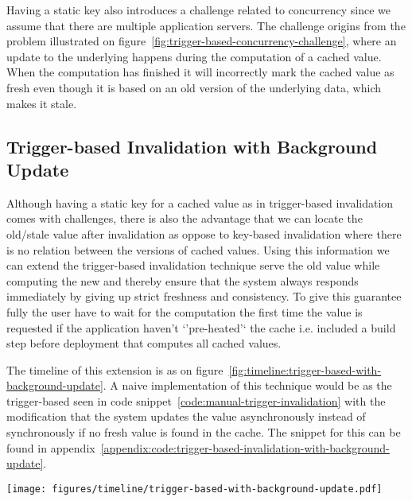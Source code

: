 Having a static key also introduces a challenge related to concurrency since we assume that there are multiple application servers. The challenge origins from the problem illustrated on figure~\ref{fig:trigger-based-concurrency-challenge}, where an update to the underlying happens during the computation of a cached value. When the computation has finished it will incorrectly mark the cached value as fresh even though it is based on an old version of the underlying data, which makes it stale.

\subsection{Trigger-based Invalidation with Background Update}
\label{subsec:trigger-based-invalidation-with-background-update}

Although having a static key for a cached value as in trigger-based invalidation comes with challenges, there is also the advantage that we can locate the old/stale value after invalidation as oppose to key-based invalidation where there is no relation between the versions of cached values. Using this information we can extend the trigger-based invalidation technique serve the old value while computing the new and thereby ensure that the system always responds immediately by giving up strict freshness and consistency. To give this guarantee fully the user have to wait for the computation the first time the value is requested if the application haven't `'pre-heated'` the cache i.e. included a build step before deployment that computes all cached values.

The timeline of this extension is as on figure~\ref{fig:timeline:trigger-based-with-background-update}. A naive implementation of this technique would be as the trigger-based seen in code snippet~\ref{code:manual-trigger-invalidation} with the modification that the system updates the value asynchronously instead of synchronously if no fresh value is found in the cache. The snippet for this can be found in appendix~\ref{appendix:code:trigger-based-invalidation-with-background-update}.

\begin{figure*}[ht!]
  \centering
  \texttt{[image: figures/timeline/trigger-based-with-background-update.pdf]}
  \caption{The lifecycle of the trigger-based invalidation technique where the value is updated in the background}
  \label{fig:timeline:trigger-based-with-background-update}
\end{figure*}

